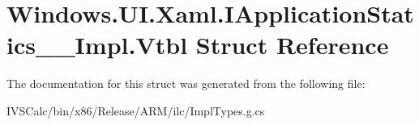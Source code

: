 \hypertarget{struct_windows_1_1_u_i_1_1_xaml_1_1_i_application_statics_____impl_1_1_vtbl}{}\section{Windows.\+U\+I.\+Xaml.\+I\+Application\+Statics\+\_\+\+\_\+\+Impl.\+Vtbl Struct Reference}
\label{struct_windows_1_1_u_i_1_1_xaml_1_1_i_application_statics_____impl_1_1_vtbl}


The documentation for this struct was generated from the following file\+:\begin{DoxyCompactItemize}
\item 
I\+V\+S\+Calc/bin/x86/\+Release/\+A\+R\+M/ilc/Impl\+Types.\+g.\+cs\end{DoxyCompactItemize}
